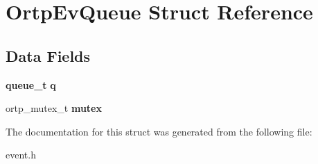 \section{Ortp\+Ev\+Queue Struct Reference}
\label{structOrtpEvQueue}
\subsection*{Data Fields}
\begin{DoxyCompactItemize}
\item 
\mbox{\label{structOrtpEvQueue_a879813c53dbca1dc116be0e0453a6a1b}} 
\textbf{ queue\+\_\+t} {\bfseries q}
\item 
\mbox{\label{structOrtpEvQueue_a6136ad42224e446bb375ade354f2faec}} 
ortp\+\_\+mutex\+\_\+t {\bfseries mutex}
\end{DoxyCompactItemize}


The documentation for this struct was generated from the following file\+:\begin{DoxyCompactItemize}
\item 
event.\+h\end{DoxyCompactItemize}
